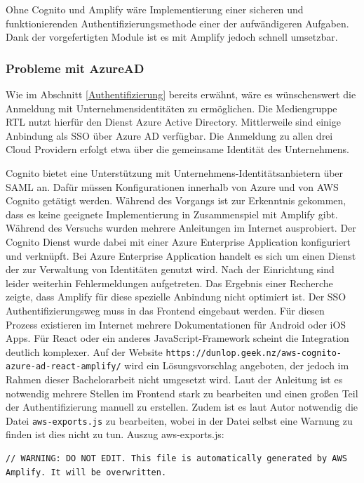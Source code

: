 Ohne Cognito und Amplify wäre Implementierung einer sicheren und funktionierenden Authentifizierungsmethode einer der aufwändigeren Aufgaben.
Dank der vorgefertigten Module ist es mit Amplify jedoch schnell umsetzbar.



\subsubsection{Probleme mit AzureAD}

Wie im Abschnitt \ref{Authentifizierung}  bereits erwähnt, wäre es wünschenswert die Anmeldung mit Unternehmensidentitäten zu ermöglichen.
Die Mediengruppe RTL nutzt hierfür den Dienst Azure Active Directory.
Mittlerweile sind einige Anbindung als SSO über Azure AD verfügbar.
Die Anmeldung zu allen drei Cloud Providern erfolgt etwa über die gemeinsame Identität des Unternehmens.

Cognito bietet eine Unterstützung mit Unternehmens-Identitätsanbietern über SAML an.
Dafür müssen Konfigurationen innerhalb von Azure und von AWS Cognito getätigt werden.
Während des Vorgangs ist zur Erkenntnis gekommen, dass es keine geeignete Implementierung in Zusammenspiel mit Amplify gibt.
Während des Versuchs wurden mehrere Anleitungen im Internet ausprobiert.
Der Cognito Dienst wurde dabei mit einer \glqq Azure Enterprise Application\grqq{} konfiguriert und verknüpft.
Bei \glqq Azure Enterprise Application\grqq{} handelt es sich um einen Dienst der zur Verwaltung von Identitäten genutzt wird.
Nach der Einrichtung sind leider weiterhin Fehlermeldungen aufgetreten.
Das Ergebnis einer Recherche zeigte, dass Amplify für diese spezielle Anbindung nicht optimiert ist.
Der SSO Authentifizierungsweg muss in das Frontend eingebaut werden.
Für diesen Prozess existieren im Internet mehrere Dokumentationen für Android oder iOS Apps.
Für React oder ein anderes JavaScript-Framework scheint die Integration deutlich komplexer.
Auf der Website \verb+https://dunlop.geek.nz/aws-cognito-azure-ad-react-amplify/+ wird ein Lösungsvorschlag angeboten, der jedoch im Rahmen dieser Bachelorarbeit nicht umgesetzt wird.
Laut der Anleitung ist es notwendig mehrere Stellen im Frontend stark zu bearbeiten und einen großen Teil der Authentifizierung manuell zu erstellen.
Zudem ist es laut Autor notwendig die Datei \verb+aws-exports.js+ zu bearbeiten, wobei in der Datei selbst eine Warnung zu finden ist dies nicht zu tun.
Auszug aws-exports.js:
\begin{lstlisting}[basicstyle=\ttfamily\small, breaklines=true , frame = single, backgroundcolor=\color{lightgray} ]
    // WARNING: DO NOT EDIT. This file is automatically generated by AWS Amplify. It will be overwritten.
    \end{lstlisting}

